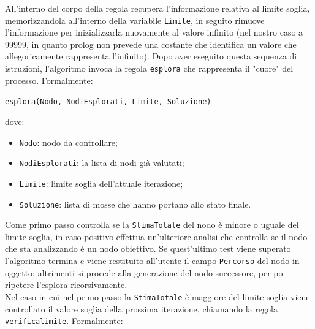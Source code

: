 \documentclass[a4paper,oneside,12pt]{book}
\def \code#1{\texttt{#1}}
\begin{document}
    All'interno del corpo della regola recupera l'informazione relativa al limite soglia, memorizzandola all'interno della variabile \code{Limite}, in seguito rimuove l'informazione per inizializzarla nuovamente al valore infinito (nel nostro caso a 99999, in quanto prolog non prevede una costante che identifica un valore che allegoricamente rappresenta l'infinito). Dopo aver eseguito questa sequenza di istruzioni, l'algoritmo invoca la regola \code{esplora} che rappresenta il "cuore" del processo. Formalmente:
    \begin{center}

        \code{esplora(Nodo, NodiEsplorati, Limite, Soluzione)}
    \end{center}
    dove:
    \begin{itemize}
        \item \code{Nodo}: nodo da controllare;
        \item \code{NodiEsplorati}: la lista di nodi già valutati;
        \item \code{Limite}: limite soglia dell'attuale iterazione;
        \item \code{Soluzione}: lista di mosse che hanno portano allo stato finale.
    \end{itemize}
    Come primo passo controlla se la \code{StimaTotale} del nodo è minore o uguale del limite soglia, in caso positivo effettua un'ulteriore analisi che controlla se il nodo che sta analizzando è un nodo obiettivo. Se quest'ultimo test viene superato l'algoritmo termina e viene restituito all'utente il campo \code{Percorso} del nodo in oggetto; altrimenti si procede alla generazione del nodo successore, per poi ripetere l'esplora ricorsivamente. \\
    Nel caso in cui nel primo passo la \code{StimaTotale} è maggiore del limite soglia viene controllato il valore soglia della prossima iterazione, chiamando la regola \code{verifica\textunderscore limite}. Formalmente:
\end{document}
